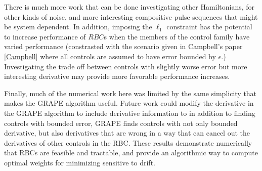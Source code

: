 \documentclass[aps,nofootinbib,pra,notitlepage,twocolumn]{revtex4-1}
\begin{document}
There is much more work that can be done investigating other Hamiltonians, for other kinds of noise, and more interesting compositive pulse sequences that might be system dependent. In addition, imposing the $\ell_1$ constraint has the potential to increase performance of $RBC$s when the members of the control family have varied performance (constrasted with the scenario given in Campbell's paper \ref{Campbell} where all controls are assumed to have error bounded by $\epsilon$.) Investigating the trade off between controls with slightly worse error but more interesting derivative may provide more favorable performance increases.

Finally, much of the numerical work here was limited by the same simplicity that makes the GRAPE algorithm useful. Future work could modify the derivative in the GRAPE algorithm to include derivative information to in addition to finding controls with bounded error, GRAPE finds controls with not only bounded derivative, but also derivatives that are wrong in a way that can cancel out the derivatives of other controls in the RBC. These results demonstrate numerically that RBCs are feasible and tractable, and provide an algorithmic way to compute optimal weights for minimizing sensitive to drift.
\end{document}
